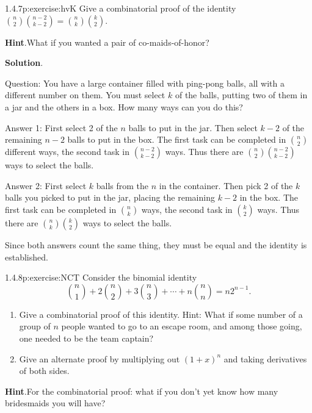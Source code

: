 \documentclass[twoside,11pt,]{book}
\newcommand{\blocktitlefont}{\relax}
\numberwithin{equation}{chapter}
\begin{document}
\begin{divisionsolution}{1.4.7}{}{p:exercise:hvK}%
Give a combinatorial proof of the identity \({n \choose 2}{n-2 \choose k-2} = {n\choose k}{k \choose 2}\).%
\par\smallskip%
\noindent\textbf{\blocktitlefont Hint}.\quad{}What if you wanted a pair of co-maids-of-honor?%
\par\smallskip%
\noindent\textbf{\blocktitlefont Solution}.\quad{}\begin{solutionproof}
Question: You have a large container filled with ping-pong balls, all with a different number on them. You must select \(k\) of the balls, putting two of them in a jar and the others in a box. How many ways can you do this?%
\par
Answer 1: First select 2 of the \(n\) balls to put in the jar. Then select \(k-2\) of the remaining \(n-2\) balls to put in the box. The first task can be completed in \({n \choose 2}\) different ways, the second task in \({n-2 \choose k-2}\) ways. Thus there are \({n \choose 2}{n-2 \choose k-2}\) ways to select the balls.%
\par
Answer 2: First select \(k\) balls from the \(n\) in the container. Then pick 2 of the \(k\) balls you picked to put in the jar, placing the remaining \(k-2\) in the box. The first task can be completed in \({n \choose k}\) ways, the second task in \({k \choose 2}\) ways. Thus there are \({n \choose k}{k \choose 2}\) ways to select the balls.%
\par
Since both answers count the same thing, they must be equal and the identity is established.%
\end{solutionproof}
\end{divisionsolution}%
\begin{divisionsolution}{1.4.8}{}{p:exercise:NCT}%
Consider the binomial identity%
\begin{equation*}
\binom{n}{1} + 2 \binom{n}{2} + 3 \binom{n}{3} + \cdots + n\binom{n}{n} = n2^{n-1}\text{.}
\end{equation*}
%
\begin{enumerate}[label=(\alph*)]
\item{}Give a combinatorial proof of this identity.  Hint: What if some number of a group of \(n\) people wanted to go to an escape room, and among those going, one needed to be the team captain?%
\item{}Give an alternate proof by multiplying out \((1+x)^n\) and taking derivatives of both sides.%
\end{enumerate}
%
\par\smallskip%
\noindent\textbf{\blocktitlefont Hint}.\quad{}For the combinatorial proof: what if you don't yet know how many bridesmaids you will have?%
\end{divisionsolution}%
\end{document}
